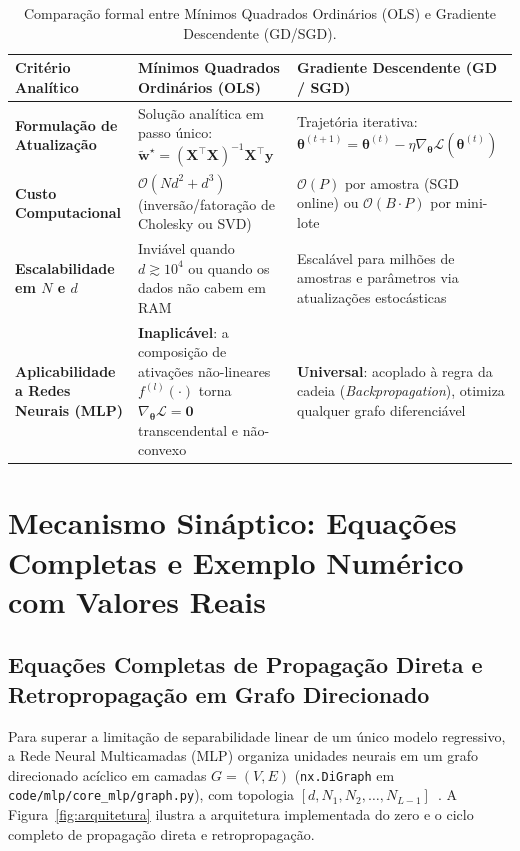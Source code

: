 \documentclass[runningheads]{llncs}
\begin{document}
\begin{table}[htbp]
\centering
\caption{Compara\c{c}\~{a}o formal entre M\'{i}nimos Quadrados Ordin\'{a}rios (OLS) e Gradiente Descendente (GD/SGD).}
\label{tab:ols_vs_gd}
\scriptsize
\begin{tabular}{p{2.7cm}p{4.4cm}p{4.7cm}}
\toprule
\textbf{Crit\'{e}rio Anal\'{i}tico} & \textbf{M\'{i}nimos Quadrados Ordin\'{a}rios (OLS)} & \textbf{Gradiente Descendente (GD / SGD)} \\
\midrule
\textbf{Formula\c{c}\~{a}o de Atualiza\c{c}\~{a}o} & Solu\c{c}\~{a}o anal\'{i}tica em passo \'{u}nico: $\tilde{\mathbf{w}}^\star = (\mathbf{X}^\top\mathbf{X})^{-1}\mathbf{X}^\top\mathbf{y}$ & Trajet\'{o}ria iterativa: $\boldsymbol{\theta}^{(t+1)} = \boldsymbol{\theta}^{(t)} - \eta \nabla_{\boldsymbol{\theta}} \mathcal{L}(\boldsymbol{\theta}^{(t)})$ \\
\textbf{Custo Computacional} & $\mathcal{O}(N d^2 + d^3)$ (invers\~{a}o/fatora\c{c}\~{a}o de Cholesky ou SVD) & $\mathcal{O}(P)$ por amostra (SGD online) ou $\mathcal{O}(B \cdot P)$ por mini-lote \\
\textbf{Escalabilidade em $N$ e $d$} & Invi\'{a}vel quando $d \gtrsim 10^4$ ou quando os dados n\~{a}o cabem em RAM & Escal\'{a}vel para milh\~{o}es de amostras e par\^{a}metros via atualiza\c{c}\~{o}es estoc\'{a}sticas \\
\textbf{Aplicabilidade a Redes Neurais (MLP)} & \textbf{Inaplic\'{a}vel}: a composi\c{c}\~{a}o de ativa\c{c}\~{o}es n\~{a}o-lineares $f^{(l)}(\cdot)$ torna $\nabla_{\boldsymbol{\theta}} \mathcal{L} = \mathbf{0}$ transcendental e n\~{a}o-convexo & \textbf{Universal}: acoplado \`{a} regra da cadeia (\textit{Backpropagation}), otimiza qualquer grafo diferenci\'{a}vel \\
\bottomrule
\end{tabular}
\end{table}

\section{Mecanismo Sin\'{a}ptico: Equa\c{c}\~{o}es Completas e Exemplo Num\'{e}rico com Valores Reais}
\label{sec:mecanismo}

\subsection{Equa\c{c}\~{o}es Completas de Propaga\c{c}\~{a}o Direta e Retropropaga\c{c}\~{a}o em Grafo Direcionado}
Para superar a limita\c{c}\~{a}o de separabilidade linear de um \'{u}nico modelo regressivo, a Rede Neural Multicamadas (MLP) organiza unidades neurais em um grafo direcionado ac\'{i}clico em camadas $G = (V, E)$ (\texttt{nx.DiGraph} em \texttt{code/mlp/core\_mlp/graph.py}), com topologia $[d, N_1, N_2, \dots, N_{L-1}]$~\cite{rumelhart1986learning,cybenko1989approximation}. A Figura~\ref{fig:arquitetura} ilustra a arquitetura implementada do zero e o ciclo completo de propaga\c{c}\~{a}o direta e retropropaga\c{c}\~{a}o.
\end{document}
